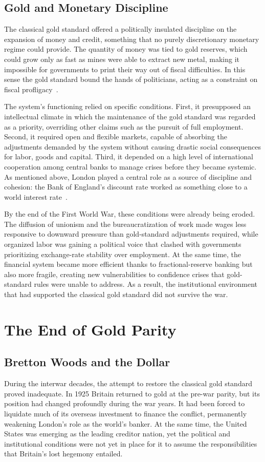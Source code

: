 \subsection{Gold and Monetary Discipline}
The classical gold standard offered a politically insulated discipline on the expansion of money and credit, something that no purely discretionary monetary regime could provide. The quantity of money was tied to gold reserves, which could grow only as fast as mines were able to extract new metal, making it impossible for governments to print their way out of fiscal difficulties. In this sense the gold standard bound the hands of politicians, acting as a constraint on fiscal profligacy~\cite{BordoKydland1995}.
 
The system's functioning relied on specific conditions. First, it presupposed an intellectual climate in which the maintenance of the gold standard was regarded as a priority, overriding other claims such as the pursuit of full employment. Second, it required open and flexible markets, capable of absorbing the adjustments demanded by the system without causing drastic social consequences for labor, goods and capital. Third, it depended on a high level of international cooperation among central banks to manage crises before they became systemic. As mentioned above, London played a central role as a source of discipline and cohesion: the Bank of England's discount rate worked as something close to a world interest rate~\cite{Eichengreen1996}.
 
By the end of the First World War, these conditions were already being eroded. The diffusion of unionism and the bureaucratization of work made wages less responsive to downward pressure than gold-standard adjustments required, while organized labor was gaining a political voice that clashed with governments prioritizing exchange-rate stability over employment. At the same time, the financial system became more efficient thanks to fractional-reserve banking but also more fragile, creating new vulnerabilities to confidence crises that gold-standard rules were unable to address. As a result, the institutional environment that had supported the classical gold standard did not survive the war.
\section{The End of Gold Parity}
\subsection{Bretton Woods and the Dollar}
During the interwar decades, the attempt to restore the classical gold standard proved inadequate. In 1925 Britain returned to gold at the pre-war parity, but its position had changed profoundly during the war years. It had been forced to liquidate much of its overseas investment to finance the conflict, permanently weakening London's role as the world's banker. At the same time, the United States was emerging as the leading creditor nation, yet the political and institutional conditions were not yet in place for it to assume the responsibilities that Britain's lost hegemony entailed.

